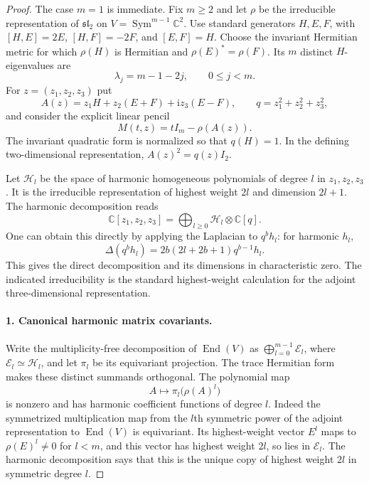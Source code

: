 \begin{proof}
The case $m=1$ is immediate. Fix $m\geq2$ and let
$\rho$ be the irreducible representation of
$\mathfrak{sl}_2$ on $V=\operatorname{Sym}^{m-1}\mathbb C^2$.
Use standard generators $H,E,F$, with
$[H,E]=2E$, $[H,F]=-2F$, and $[E,F]=H$.
Choose the invariant Hermitian metric for which
$\rho(H)$ is Hermitian and $\rho(E)^*=\rho(F)$.
Its $m$ distinct $H$-eigenvalues are
\[
 \lambda_j=m-1-2j,\qquad 0\leq j<m.
\]
For $z=(z_1,z_2,z_3)$ put
\[
 A(z)=z_1H+z_2(E+F)+\mathrm i z_3(E-F),\qquad
 q=z_1^2+z_2^2+z_3^2,
\]
and consider the explicit linear pencil
\begin{equation}\label{G15:pencil}
 M(t,z)=tI_m-\rho(A(z)).
\end{equation}
The invariant quadratic form is normalized so that
$q(H)=1$. In the defining two-dimensional representation,
$A(z)^2=q(z)I_2$.

Let $\mathcal H_l$ be the space of harmonic homogeneous
polynomials of degree $l$ in $z_1,z_2,z_3$. It is the
irreducible representation of highest weight $2l$ and
dimension $2l+1$. The harmonic decomposition reads
\begin{equation}\label{G15:harmonic}
 \mathbb C[z_1,z_2,z_3]
     =\bigoplus_{l\geq0}\mathcal H_l\otimes\mathbb C[q].
\end{equation}
One can obtain this directly by applying the Laplacian to
$q^b h_l$: for harmonic $h_l$,
\[
 \Delta(q^b h_l)=2b(2l+2b+1)q^{b-1}h_l.
\]
This gives the direct decomposition and its dimensions in
characteristic zero. The indicated irreducibility is the
standard highest-weight calculation for the adjoint
three-dimensional representation.

\paragraph{1. Canonical harmonic matrix covariants.}
Write the multiplicity-free decomposition of
$\operatorname{End}(V)$ as
$\bigoplus_{l=0}^{m-1}\mathcal E_l$, where
$\mathcal E_l\simeq\mathcal H_l$, and let $\pi_l$ be its
equivariant projection. The trace Hermitian form makes
these distinct summands orthogonal. The polynomial map
\[
 A\longmapsto\pi_l\bigl(\rho(A)^l\bigr)
\]
is nonzero and has harmonic coefficient functions of
degree $l$. Indeed the symmetrized multiplication map
from the $l$th symmetric power of the adjoint
representation to $\operatorname{End}(V)$ is equivariant.
Its highest-weight vector $E^l$ maps to
$\rho(E)^l\ne0$ for $l<m$, and this vector has highest
weight $2l$, so lies in $\mathcal E_l$. The harmonic
decomposition says that this is the unique copy of
highest weight $2l$ in symmetric degree $l$.


\end{proof}
